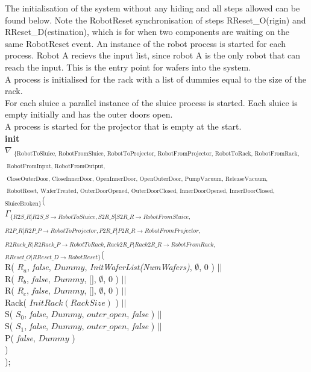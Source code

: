\documentclass[12pt]{report}
\begin{document}
	The initialisation of the system without any hiding and all steps allowed can be found below. Note the RobotReset synchronisation of steps RReset\_O(rigin) and RReset\_D(estination), which is for when two components are waiting on the same RobotReset event. An instance of the robot process is started for each process. Robot A recievs the input list, since robot A is the only robot that can reach the input. This is the entry point for wafers into the system.\\
	A process is initialised for the rack with a list of dummies equal to the size of the rack.\\
	For each sluice a parallel instance of the sluice process is started. Each sluice is empty initially and has the outer doors open.\\
	A process is started for the projector that is empty at the start.\\
	\textbf{init}\\
	$\nabla_{\text{ \{RobotToSluice, RobotFromSluice, RobotToProjector, RobotFromProjector, RobotToRack, RobotFromRack,}}$\\
	\phantom{--} $_{ \text{ RobotFromInput, RobotFromOutput,}}$\\
	\phantom{--} $_{ \text{ CloseOuterDoor, CloseInnerDoor, OpenInnerDoor, OpenOuterDoor, PumpVacuum, ReleaseVacuum,}}$\\
	\phantom{--} $_{ \text{ RobotReset, WaferTreated, OuterDoorOpened, OuterDoorClosed, InnerDoorOpened, InnerDoorClosed, VacuumDone, VacuumReleased,}}$\\
	\phantom{--} $_{ \text{SluiceBroken\}}}$(\\
	\phantom{---} $\Gamma_{\{R2S\_R|R2S\_S\rightarrow RobotToSluice,S2R\_S|S2R\_R\rightarrow RobotFromSluice,}$\\
	\phantom{-----} $_{ R2P\_R|R2P\_P\rightarrow RobotToProjector, P2R\_P|P2R\_R\rightarrow RobotFromProjector,}$\\
	\phantom{-----} $_{ R2Rack\_R|R2Rack\_P\rightarrow RobotToRack, Rack2R\_P|Rack2R\_R\rightarrow RobotFromRack,}$\\
	\phantom{-----} $_{ RReset\_O|RReset\_D\rightarrow RobotReset \}}$(\\
	\phantom{---------} R( $R_a$, \emph{false}, $Dummy$, \emph{InitWaferList(NumWafers)}, $\emptyset$, 0 ) $||$\\
	\phantom{---------} R( $R_b$, \emph{false}, $Dummy$, [], $\emptyset$, 0 ) $||$\\
	\phantom{---------} R( $R_c$, \emph{false}, $Dummy$, [], $\emptyset$, 0 ) $||$\\
	\phantom{---------} Rack( $InitRack(RackSize)$ ) $||$\\
	\phantom{---------} S( $S_0$, \emph{false}, $Dummy$, $outer\_open$, \emph{false} ) $||$\\
	\phantom{---------} S( $S_1$, \emph{false}, $Dummy$, $outer\_open$, \emph{false} ) $||$\\
	\phantom{---------} P( \emph{false}, $Dummy$ )\\
	\phantom{---} )\\
	);
	
\end{document}
